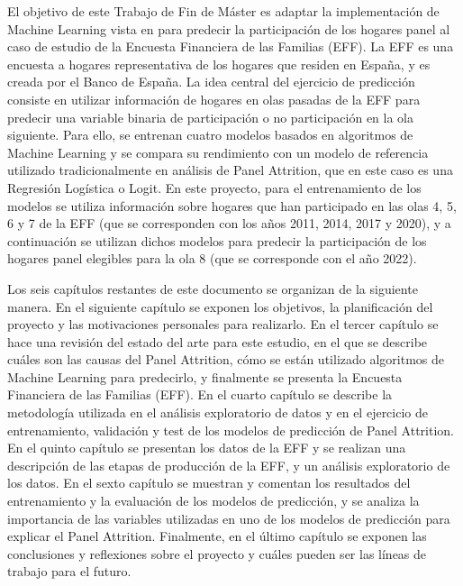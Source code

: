 El objetivo de este Trabajo de Fin de Máster es adaptar la implementación de Machine Learning vista en \cite{beste2023case} para predecir la participación de los hogares panel al caso de estudio de la Encuesta Financiera de las Familias (EFF). La EFF es una encuesta a hogares representativa de los hogares que residen en España, y es creada por el Banco de España. La idea central del ejercicio de predicción consiste en utilizar información de hogares en olas pasadas de la EFF para predecir una variable binaria de participación o no participación en la ola siguiente. Para ello, se entrenan cuatro modelos basados en algoritmos de Machine Learning y se compara su rendimiento con un modelo de referencia utilizado tradicionalmente en análisis de Panel Attrition, que en este caso es una Regresión Logística o Logit. En este proyecto, para el entrenamiento de los modelos se utiliza información sobre hogares que han participado en las olas 4, 5, 6 y 7 de la EFF (que se corresponden con los años 2011, 2014, 2017 y 2020), y a continuación se utilizan dichos modelos para predecir la participación de los hogares panel elegibles para la ola 8 (que se corresponde con el año 2022).

Los seis capítulos restantes de este documento se organizan de la siguiente manera. En el siguiente capítulo se exponen los objetivos, la planificación del proyecto y las motivaciones personales para realizarlo. En el tercer capítulo se hace una revisión del estado del arte para este estudio, en el que se describe cuáles son las causas del Panel Attrition, cómo se están utilizado algoritmos de Machine Learning para predecirlo, y finalmente se presenta la Encuesta Financiera de las Familias (EFF). En el cuarto capítulo se describe la metodología utilizada en el análisis exploratorio de datos y en el ejercicio de entrenamiento, validación y test de los modelos de predicción de Panel Attrition. En el quinto capítulo se presentan los datos de la EFF y se realizan una descripción de las etapas de producción de la EFF, y un análisis exploratorio de los datos. En el sexto capítulo se muestran y comentan los resultados del entrenamiento y la evaluación de los modelos de predicción, y se analiza la importancia de las variables utilizadas en uno de los modelos de predicción para explicar el Panel Attrition. Finalmente, en el último capítulo se exponen las conclusiones y reflexiones sobre el proyecto y cuáles pueden ser las líneas de trabajo para el futuro.